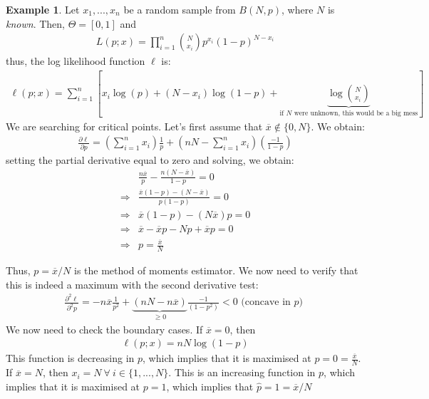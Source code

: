 \documentclass[11pt]{scrartcl}
\theoremstyle{definition}
\newtheorem{ex}{Example}
\theoremstyle{remark}
\begin{document}
\begin{ex}
	Let $x_1, ..., x_n$ be a random sample from $B(N, p)$, where $N$ is \emph{known}. Then, $\Theta = [0,1]$ and 
	\begin{align*}
		L(p; x) = \prod_{i=1}^n \binom{N}{x_i} p^{x_i} (1-p)^{N-x_i} 	
	\end{align*}
	thus, the log likelihood function $\ell$ is: 
	\begin{align*}
		\ell(p;x)  = \sum_{i=1}^n \left[ x_i \log(p) + (N-x_i) \log(1-p) + \underbrace{\log \binom{N}{x_i}	}_{\text{if $N$ were unknown, this would be a big mess}}		\right] 
	\end{align*}
	We are searching for critical points. Let's first assume that $\overline{x} \notin \{0, N \}$. We obtain: 
	\begin{align*}
		\frac{\partial \ell}{\partial p}	 = \left( \sum_{i=1}^n x_i \right) \frac{1}{p} + \left( nN - \sum_{i=1}^n x_i \right) \left( \frac{-1}{1-p} \right) 
	\end{align*}
	setting the partial derivative equal to zero and solving, we obtain: 
	\begin{align*}
		& \frac{n\overline{x}}{p} - \frac{n(N-\overline{x})}{1-p} = 0 \\
		\Rightarrow & \frac{\overline{x}(1-p)-(N-\overline{x})}{p(1-p)} = 0 \\
		\Rightarrow & \overline{x}(1-p) - (N \overline{x})p = 0 \\
		\Rightarrow & \overline{x} - \overline{x} p - N p + \overline{x} p = 0 \\
		\Rightarrow & p  = \frac{\overline{x}}{N}	
	\end{align*}

\end{ex}
Thus, $p = \overline{x} / N$ is the method of moments estimator. We now need to verify that this is indeed a maximum with the second derivative test: 
\begin{align*}
	\frac{\partial^2 \ell}{\partial^2 p}	 = -n \overline{x} \frac{1}{p^2} + \underbrace{(nN - n \overline{x})}_{\geq 0 } \frac{-1}{(1-p^2)} < 0  \text{ (concave in $p$) } 
\end{align*}
We now need to check the boundary cases. If $\overline{x} = 0$, then 
\begin{align*}
	\ell(p; x) = nN \log (1-p) 	
\end{align*}
This function is decreasing in $p$, which implies that it is maximised at $p=0 = \frac{\overline{x}}{N}$. If $\overline{x} = N$, then $x_i = N\ \forall\ i \in \{ 1, ..., N \}$. This is an increasing function in $p$, which implies that it is maximised at $p=1$, which implies that $\hat{p} = 1 = \overline{x}/N$ 
\end{document}
